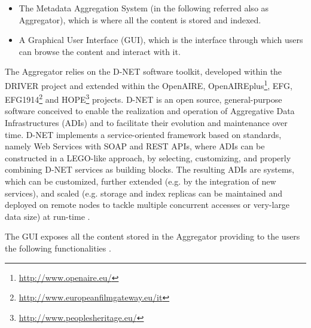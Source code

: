 \documentclass[amsthm,ebook]{saparticle}
\begin{document}
\begin{itemize}
\item The Metadata Aggregation System (in the following referred also as Aggregator), which is where all the content is
stored and indexed.
\item A Graphical User Interface (GUI), which is the interface through which users can browse the content and interact
with it.
\end{itemize}
The Aggregator relies on the D-NET software toolkit, developed within the DRIVER project and extended within the
OpenAIRE, OpenAIREplus\footnote{\url{http://www.openaire.eu/}}, EFG, EFG1914\footnote{\url{http://www.europeanfilmgateway.eu/it}}
and HOPE\footnote{\url{http://www.peoplesheritage.eu/}} projects. D-NET is an open source, general-purpose software conceived
to enable the realization and operation of Aggregative Data Infrastructures (ADIs) and to facilitate their evolution
and maintenance over time. D-NET implements a service-oriented framework based on standards, namely Web Services with
SOAP and REST APIs, where ADIs can be constructed in a LEGO-like approach, by selecting, customizing, and properly
combining D-NET services as building blocks. The resulting ADIs are systems, which can be customized, further extended
(e.g. by the integration of new services), and scaled (e.g. storage and index replicas can be maintained and deployed
on remote nodes to tackle multiple concurrent accesses or very-large data size) at run-time \citep{amato_aim_2013}.

The GUI exposes all the content stored in the Aggregator providing to the users the following functionalities \citep{prandoni_eagle_2014}.
\end{document}
